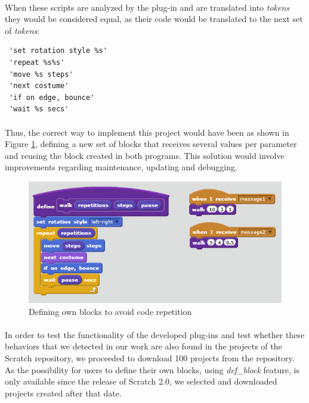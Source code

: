 \documentclass[a4paper,10pt]{article}
\begin{document}
\paragraph{}When these scripts are analyzed by the plug-in and are translated into \textit{tokens} they would be considered equal, as their code would be translated to the next set of \textit{tokens}:
\begin{verbatim}
 'set rotation style %s'
 'repeat %s%s'
 'move %s steps'
 'next costume'
 'if on edge, bounce'
 'wait %s secs'
\end{verbatim}
\paragraph{}Thus, the correct way to implement this project would have been as shown in Figure \ref{fig:CodeRepetition2}, defining a new set of blocks that receives several values per parameter and reusing the block created in both programs. This solution would involve improvements regarding maintenance, updating and debugging.

\begin{figure}
  \centering
    \includegraphics{img/CodeRepetition2.png}
  \caption{Defining own blocks to avoid code repetition}
  \label{fig:CodeRepetition2}
\end{figure}

\paragraph{}In order to test the functionality of the developed plug-ins and test whether these behaviors that we detected in our work are also found in the projects of the Scratch repository, we proceeded to download 100 projects from the repository. As the possibility for users to define their own blocks, using \textit{def\_block} feature, is only available since the release of Scratch 2.0, we selected and downloaded projects created after that date.
\end{document}
